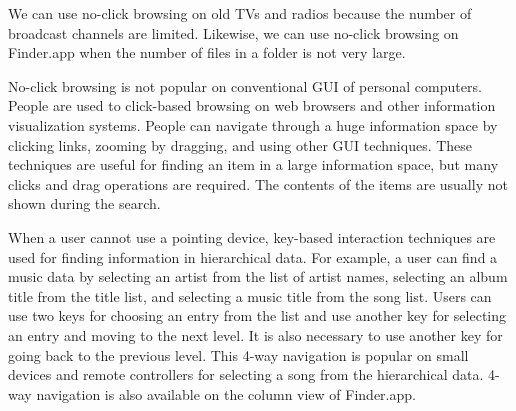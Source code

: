 \documentclass[conference]{IEEEtran}
\begin{document}
We can use no-click browsing on old TVs and radios because the number of
broadcast channels are limited.
Likewise, we can use no-click browsing on Finder.app when the number of files
in a folder is not very large.

No-click browsing is not popular on conventional GUI of personal computers.
People are used to click-based browsing on web browsers and other
information visualization systems.
People can navigate through a huge information space by
clicking links, zooming by dragging, and using other GUI techniques.
These techniques are useful for finding an item in a large information space,
but many clicks and drag operations are required.
The contents of the items are usually not shown during the search.

% 



When a user cannot use a pointing device,
key-based interaction techniques are used for
finding information in hierarchical data.
%
For example, a user can find a music data by
selecting an artist from the list of artist names,
selecting an album title from the title list,
and selecting a music title from the song list.
%
Users can use two keys for choosing an entry from the list
and use another key for selecting an entry and moving to the next level.
It is also necessary to use another key for going back to the previous level.
This 4-way navigation is popular on small devices
and remote controllers for selecting a song from the hierarchical data.
4-way navigation is also available on the column view of Finder.app.
\end{document}

